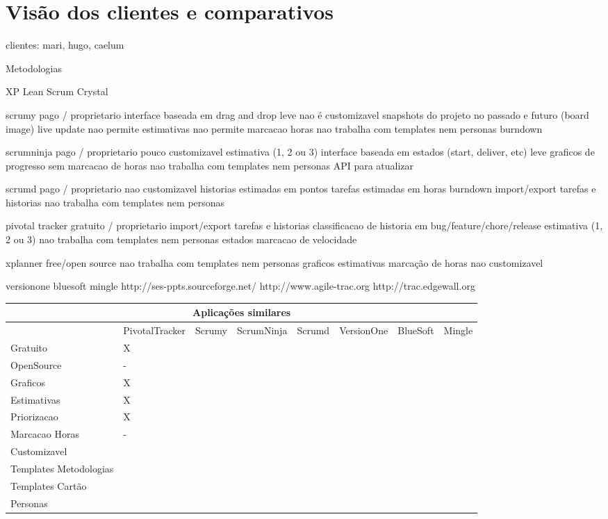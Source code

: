 \section{Visão dos clientes e comparativos}

clientes: mari, hugo, caelum

Metodologias

XP
Lean
Scrum
Crystal


scrumy
	pago / proprietario
	interface baseada em drag and drop
	leve
	nao é customizavel
	snapshots do projeto no passado e futuro (board image)
	live update
	nao permite estimativas
	nao permite marcacao horas
	nao trabalha com templates nem personas
	burndown
	
scrumninja
	pago / proprietario
	pouco customizavel
	estimativa (1, 2 ou 3)
	interface baseada em estados (start, deliver, etc)
	leve
	graficos de progresso
	sem marcacao de horas
	nao trabalha com templates nem personas
	API para atualizar 

scrumd
  pago / proprietario
  nao customizavel
  historias estimadas em pontos
  tarefas estimadas em horas
  burndown
	import/export tarefas e historias
	nao trabalha com templates nem personas

pivotal tracker
	gratuito / proprietario
	import/export tarefas e historias
	classificacao de historia em bug/feature/chore/release
	estimativa (1, 2 ou 3)
	nao trabalha com templates nem personas
	estados
	marcacao de velocidade
	
xplanner
	free/open source
	nao trabalha com templates nem personas
	graficos
	estimativas
	marcação de horas
	nao customizavel
	
versionone
bluesoft
mingle
http://ses-ppts.sourceforge.net/
http://www.agile-trac.org
http://trac.edgewall.org


\begin{sidewaystable}
	\begin{tabular}{|l|l|l|l|l|l|l|l}
		\hline
		\multicolumn{8}{|c|}{Aplicações similares} \\
		\hline
		 & PivotalTracker & Scrumy & ScrumNinja & Scrumd & VersionOne & BlueSoft & Mingle \\
		Gratuito & X & & & & & & \\
		OpenSource & - & & & & & & \\
		Graficos & X & & & & & & \\
		Estimativas & X & & & & & & \\
		Priorizacao & X & & & & & & \\
		Marcacao Horas & - & & & & & & \\
		Customizavel & & & & & & & \\
		Templates Metodologias & & & & & & & \\
		Templates Cartão & & & & & & & \\
		Personas & & & & & & & \\
		\hline
	\end{tabular}
\end{sidewaystable}


